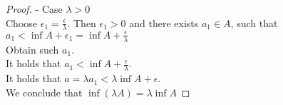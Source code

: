 \documentclass{article}
\theoremstyle{mytheoremstyle}
\theoremstyle{mytheoremstyle}
\theoremstyle{myproblemstyle}
\begin{document}
\begin{proof}
        - Case $\lambda > 0$ \\
        Choose $\epsilon_1 = \frac{\epsilon}{\lambda}$. Then $\epsilon_1 > 0$ and there exists $a_1 \in A$, such that $a_1 < \inf A + \epsilon_1 = \inf A + \frac{\epsilon}{\lambda}$ \\
        Obtain such $a_1$. \\
        It holds that $a_1 < \inf A + \frac{\epsilon}{\lambda}$. \\
        It holds that $a = \lambda a_1 < \lambda \inf A + \epsilon$. \\
        We conclude that $\inf(\lambda A) = \lambda \inf A$
    \end{proof}
\end{document}

